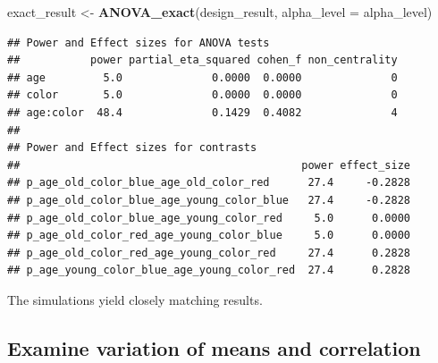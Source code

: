 \documentclass[]{book}
\newenvironment{Shaded}{\begin{snugshade}}{\end{snugshade}}
\newcommand{\DataTypeTok}[1]{\textcolor[rgb]{0.13,0.29,0.53}{#1}}
\newcommand{\KeywordTok}[1]{\textcolor[rgb]{0.13,0.29,0.53}{\textbf{#1}}}
\newcommand{\NormalTok}[1]{#1}
\newcommand{\StringTok}[1]{\textcolor[rgb]{0.31,0.60,0.02}{#1}}
\begin{document}
\begin{Shaded}
\begin{Highlighting}[]
\NormalTok{exact_result <-}\StringTok{ }\KeywordTok{ANOVA_exact}\NormalTok{(design_result, }\DataTypeTok{alpha_level =}\NormalTok{ alpha_level)}
\end{Highlighting}
\end{Shaded}

\begin{verbatim}
## Power and Effect sizes for ANOVA tests
##           power partial_eta_squared cohen_f non_centrality
## age         5.0              0.0000  0.0000              0
## color       5.0              0.0000  0.0000              0
## age:color  48.4              0.1429  0.4082              4
## 
## Power and Effect sizes for contrasts
##                                            power effect_size
## p_age_old_color_blue_age_old_color_red      27.4     -0.2828
## p_age_old_color_blue_age_young_color_blue   27.4     -0.2828
## p_age_old_color_blue_age_young_color_red     5.0      0.0000
## p_age_old_color_red_age_young_color_blue     5.0      0.0000
## p_age_old_color_red_age_young_color_red     27.4      0.2828
## p_age_young_color_blue_age_young_color_red  27.4      0.2828
\end{verbatim}

The simulations yield closely matching results.

\hypertarget{examine-variation-of-means-and-correlation}{%
\subsection{Examine variation of means and correlation}\label{examine-variation-of-means-and-correlation}}
\end{document}
